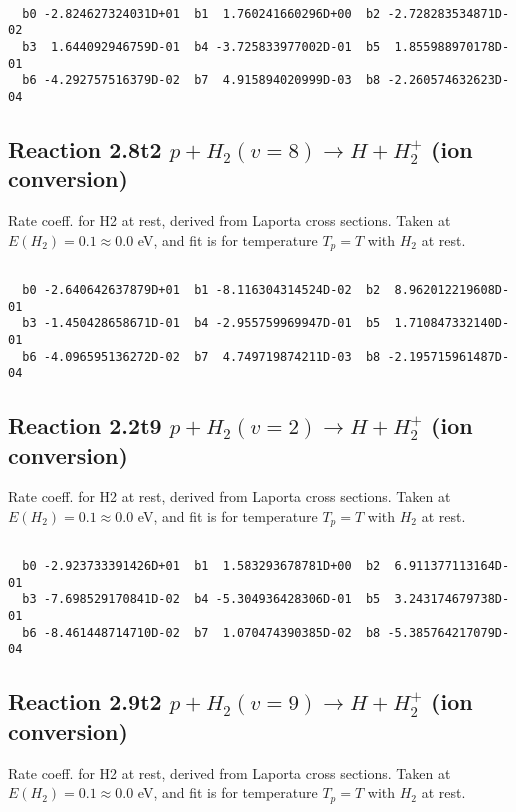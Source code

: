 \begin{small}\begin{verbatim}

  b0 -2.824627324031D+01  b1  1.760241660296D+00  b2 -2.728283534871D-02
  b3  1.644092946759D-01  b4 -3.725833977002D-01  b5  1.855988970178D-01
  b6 -4.292757516379D-02  b7  4.915894020999D-03  b8 -2.260574632623D-04

\end{verbatim}\end{small}

\newpage
\subsection{
Reaction 2.8t2
$ p + H_2(v=8) \rightarrow H + H_2^+$ (ion conversion)
}
Rate coeff. for H2 at rest, derived from Laporta cross sections.
Taken at $E(H_2) = 0.1 \approx 0.0$ eV,  and fit is for temperature $T_p=T$ with $H_2$ at rest.

\begin{small}\begin{verbatim}

  b0 -2.640642637879D+01  b1 -8.116304314524D-02  b2  8.962012219608D-01
  b3 -1.450428658671D-01  b4 -2.955759969947D-01  b5  1.710847332140D-01
  b6 -4.096595136272D-02  b7  4.749719874211D-03  b8 -2.195715961487D-04

\end{verbatim}\end{small}

\newpage
\subsection{
Reaction 2.2t9
$ p + H_2(v=2) \rightarrow H + H_2^+$ (ion conversion)
}
Rate coeff. for H2 at rest, derived from Laporta cross sections.
Taken at $E(H_2) = 0.1 \approx 0.0$ eV,  and fit is for temperature $T_p=T$ with $H_2$ at rest.

\begin{small}\begin{verbatim}

  b0 -2.923733391426D+01  b1  1.583293678781D+00  b2  6.911377113164D-01
  b3 -7.698529170841D-02  b4 -5.304936428306D-01  b5  3.243174679738D-01
  b6 -8.461448714710D-02  b7  1.070474390385D-02  b8 -5.385764217079D-04

\end{verbatim}\end{small}

\newpage
\subsection{
Reaction 2.9t2
$ p + H_2(v=9) \rightarrow H + H_2^+$ (ion conversion)
}
Rate coeff. for H2 at rest, derived from Laporta cross sections.
Taken at $E(H_2) = 0.1 \approx 0.0$ eV,  and fit is for temperature $T_p=T$ with $H_2$ at rest.

